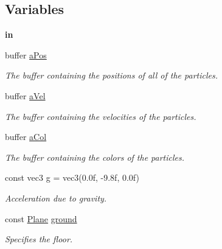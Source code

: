 \subsection*{Variables}
\begin{DoxyCompactItemize}
\item 
\mbox{\label{bouncing__particles_8comp_a64b0840001d30ff8cd416759a03542ce}} 
{\bfseries in}
\item 
buffer \hyperlink{bouncing__particles_8comp_a9f39e8aaa860ed0953f27908a3b221d0}{a\+Pos}
\begin{DoxyCompactList}\small\item\em The buffer containing the positions of all of the particles. \end{DoxyCompactList}\item 
buffer \hyperlink{bouncing__particles_8comp_a8873b6c4414371b20f8c9adb4fbb0b0e}{a\+Vel}
\begin{DoxyCompactList}\small\item\em The buffer containing the velocities of the particles. \end{DoxyCompactList}\item 
buffer \hyperlink{bouncing__particles_8comp_a41cc0a0d722413ed428da01e38311893}{a\+Col}
\begin{DoxyCompactList}\small\item\em The buffer containing the colors of the particles. \end{DoxyCompactList}\item 
\mbox{\label{bouncing__particles_8comp_afbfc2de3569f43befe0b8abf8ff644e3}} 
const vec3 \hyperlink{bouncing__particles_8comp_afbfc2de3569f43befe0b8abf8ff644e3}{g} = vec3(0.\+0f, -\/9.\+8f, 0.\+0f)
\begin{DoxyCompactList}\small\item\em Acceleration due to gravity. \end{DoxyCompactList}\item 
const \hyperlink{struct_plane}{Plane} \hyperlink{bouncing__particles_8comp_ad95bc51bdd453bc39861ab0250f2bc14}{ground}
\begin{DoxyCompactList}\small\item\em Specifies the floor. \end{DoxyCompactList}\item 
\mbox{\label{bouncing__particles_8comp_abf1cc62bbea63dfe4f91fe35f052ae2e}} 

\end{DoxyCompactItemize}
